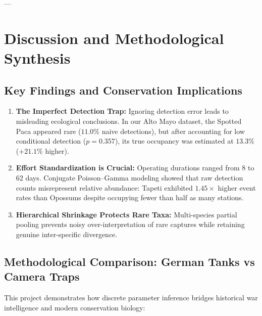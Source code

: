 \documentclass[11pt,a4paper]{article}
\begin{document}
---

\section{Discussion and Methodological Synthesis}

\subsection{Key Findings and Conservation Implications}
\begin{enumerate}
    \item \textbf{The Imperfect Detection Trap:} Ignoring detection error leads to misleading ecological conclusions. In our Alto Mayo dataset, the Spotted Paca appeared rare ($11.0\%$ naive detections), but after accounting for low conditional detection ($p = 0.357$), its true occupancy was estimated at $13.3\%$ ($+21.1\%$ higher).
    \item \textbf{Effort Standardization is Crucial:} Operating durations ranged from 8 to 62 days. Conjugate Poisson--Gamma modeling showed that raw detection counts misrepresent relative abundance: Tapeti exhibited $1.45\times$ higher event rates than Opossums despite occupying fewer than half as many stations.
    \item \textbf{Hierarchical Shrinkage Protects Rare Taxa:} Multi-species partial pooling prevents noisy over-interpretation of rare captures while retaining genuine inter-specific divergence.
\end{enumerate}

\subsection{Methodological Comparison: German Tanks vs Camera Traps}
This project demonstrates how discrete parameter inference bridges historical war intelligence and modern conservation biology:
\end{document}
